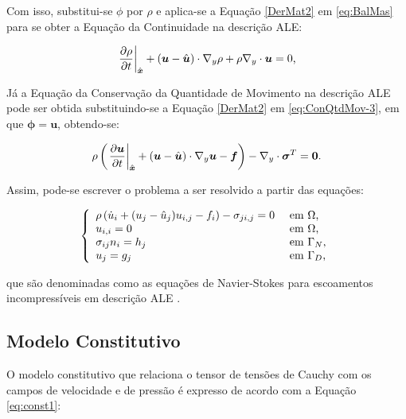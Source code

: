 Com isso, substitui-se $\phi$ por $\rho$ e aplica-se a Equação \ref{DerMat2} em \ref{eq:BalMas} para se obter a Equação da Continuidade na descrição ALE:

\begin{equation}
    \left.\frac{\partial{\rho}}{\partial{t}}\right|_{\hat{\boldsymbol{x}}}+(\boldsymbol{u}-\hat{\boldsymbol{u}})\cdot\boldsymbol{}{\nabla_y}\rho+\rho\boldsymbol{}{\nabla_y}\cdot\boldsymbol{u}=0\text{,}
    \label{ConMas4}
\end{equation}

Já a Equação da Conservação da Quantidade de Movimento na descrição ALE pode ser obtida substituindo-se a Equação \ref{DerMat2} em \ref{eq:ConQtdMov-3}, em que $\mathbf{\phi}=\mathbf{u}$, obtendo-se:

\begin{equation}
    \rho\left(\left.\frac{\partial{\boldsymbol{u}}}{\partial{t}}\right|_{\hat{\boldsymbol{x}}}+(\boldsymbol{u}-\hat{\boldsymbol{u}})\cdot\boldsymbol{}{\nabla_y}\boldsymbol{u}-\boldsymbol{f}\right)-\boldsymbol{}{\nabla_y}\cdot\boldsymbol{\sigma}^T=\boldsymbol{0}\text{.}
    \label{ConQtdMov10}
\end{equation}

Assim, pode-se escrever o problema a ser resolvido a partir das equações:

\begin{equation}
    \left\{
    \begin{array}{ll}
        \rho\left({\dot{u}_i+(u_j-\hat{u}_j)u_{i,j}-f_i}\right)-\sigma_{ji,j}=0 & \text{ em }\Omega\text{,}   \\
        u_{i,i}=0                                                         & \text{ em }\Omega\text{,}   \\
        \sigma_{ij}n_i=h_j                                                & \text{ em }\Gamma_N\text{,} \\
        u_j=g_j                                                           & \text{ em }\Gamma_D\text{,}
    \end{array}
    \right.\label{eq:NS-ALE}
\end{equation}

\noindent que são denominadas como as equações de Navier-Stokes para escoamentos incompressíveis em descrição ALE \cite{bazilevs2013computational}.

\subsection{Modelo Constitutivo} \label{MC}

O modelo constitutivo que relaciona o tensor de tensões de Cauchy com os campos de velocidade e de pressão é expresso de acordo com a Equação \ref{eq:const1}:

